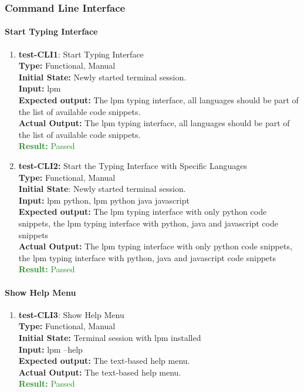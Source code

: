 \documentclass[12pt, titlepage]{article}
\begin{document}
\subsubsection{Command Line Interface}

\paragraph{Start Typing Interface}
\begin{enumerate}
\item{\textbf{test-CLI1}: Start Typing Interface\\}
\textbf{Type:} Functional, Manual \\
\textbf{Initial State:} Newly started terminal session.\\
\textbf{Input:} lpm\\
\textbf{Expected output: } The lpm typing interface, all languages should be part of the list of available code snippets.\\
\textbf{Actual Output:} The lpm typing interface, all languages should be part of the list of available code snippets.\\
\textcolor{ForestGreen}{\textbf{Result:} Passed}

\item{\textbf{test-CLI2:} Start the Typing Interface with Specific Languages\\}
\textbf{Type:} Functional, Manual \\
\textbf{Initial State}: Newly started terminal session.\\
\textbf{Input:} lpm python, lpm python java javascript\\
\textbf{Expected output: } The lpm typing interface with only python code snippets, the lpm typing interface with python, java and javascript code snippets\\
\textbf{Actual Output:} The lpm typing interface with only python code snippets, the lpm typing interface with python, java and javascript code snippets\\
\textcolor{ForestGreen}{\textbf{Result:} Passed}
\end{enumerate}

\paragraph{Show Help Menu}

\begin{enumerate}
\item{\textbf{test-CLI3}: Show Help Menu\\}
\textbf{Type:} Functional, Manual\\
\textbf{Initial State:} Terminal session with lpm installed \\
\textbf{Input:} lpm --help \\
\textbf{Expected output: } The text-based help menu.\\
\textbf{Actual Output:} The text-based help menu.\\
\textcolor{ForestGreen}{\textbf{Result:} Passed}
\end{enumerate}
\end{document}
